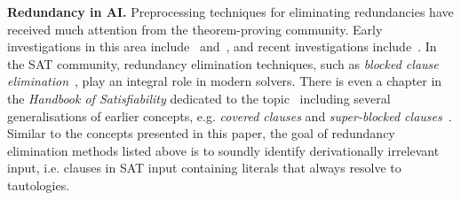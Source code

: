 \textbf{Redundancy in AI.}
Preprocessing techniques for eliminating redundancies have received much attention from the theorem-proving community.  Early investigations in this area include~\cite{HoderKKV12} and~\cite{KhasidashviliK16}, and recent investigations include~\cite{VukmirovicBH23}. 
In the SAT community, redundancy elimination techniques, such as \emph{blocked clause elimination}~\cite{Kullmann99}, play an integral role in modern solvers. There is even a chapter in the \emph{Handbook of Satisfiability} dedicated to the topic~\cite{BiereJK21} including several generalisations of earlier concepts, e.g. \emph{covered clauses} \cite{HeuleJB10a,BarnettCB20} and \emph{super-blocked clauses}~\cite{KieslSTB16}. Similar to the concepts presented in this paper, the goal of redundancy elimination methods listed above is to soundly identify derivationally irrelevant input, i.e. clauses in SAT input containing literals that always resolve to tautologies.